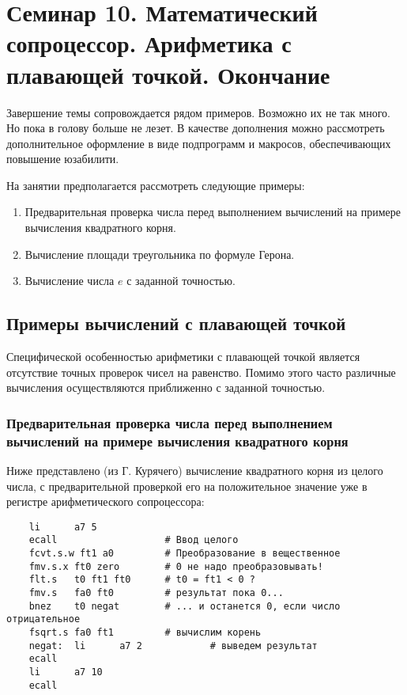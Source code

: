 \chapter[Арифметика с плавающей точкой. Примеры]{Семинар 10. Математический сопроцессор. Арифметика с плавающей точкой. Окончание}

Завершение темы сопровождается рядом примеров. Возможно их не так много. Но пока в голову больше не лезет. В качестве дополнения можно рассмотреть дополнительное оформление в виде подпрограмм и макросов, обеспечивающих повышение юзабилити.

На занятии предполагается рассмотреть следующие примеры:
\begin{enumerate}
    \item Предварительная проверка числа перед выполнением вычислений на примере вычисления квадратного корня.
    \item Вычисление площади треугольника по формуле Герона.
    \item Вычисление числа $e$ с заданной точностью.
\end{enumerate}


\section{Примеры вычислений с плавающей точкой}

Специфической особенностью арифметики с плавающей точкой является отсутствие точных проверок чисел на равенство. Помимо этого часто различные вычисления осуществляются приближенно с заданной точностью.

\subsection{Предварительная проверка числа перед выполнением вычислений на примере вычисления квадратного корня}

Ниже представлено (из Г. Курячего) вычисление квадратного корня из целого числа, с предварительной проверкой его на положительное значение уже в регистре арифметического сопроцессора:

\begin{verbatim}
    li      a7 5
    ecall                   # Ввод целого
    fcvt.s.w ft1 a0         # Преобразование в вещественное
    fmv.s.x ft0 zero        # 0 не надо преобразовывать!
    flt.s   t0 ft1 ft0      # t0 = ft1 < 0 ?
    fmv.s   fa0 ft0         # результат пока 0...
    bnez    t0 negat        # ... и останется 0, если число отрицательное
    fsqrt.s fa0 ft1         # вычислим корень
    negat:  li      a7 2            # выведем результат
    ecall
    li      a7 10
    ecall
\end{verbatim}

